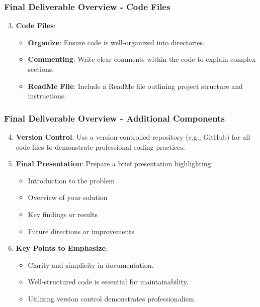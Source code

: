 \documentclass[aspectratio=169]{beamer}
\begin{document}
\begin{frame}[fragile]
    \frametitle{Final Deliverable Overview - Code Files}
    \begin{enumerate}
        \setcounter{enumi}{2}
        \item \textbf{Code Files}:
        \begin{itemize}
            \item \textbf{Organize}: Ensure code is well-organized into directories.
            \item \textbf{Commenting}: Write clear comments within the code to explain complex sections.
            \item \textbf{ReadMe File}: Include a ReadMe file outlining project structure and instructions.
        \end{itemize}
    \end{enumerate}
\end{frame}

\begin{frame}[fragile]
    \frametitle{Final Deliverable Overview - Additional Components}
    \begin{enumerate}
        \setcounter{enumi}{3}
        \item \textbf{Version Control}: Use a version-controlled repository (e.g., GitHub) for all code files to demonstrate professional coding practices.
        
        \item \textbf{Final Presentation}: Prepare a brief presentation highlighting:
        \begin{itemize}
            \item Introduction to the problem
            \item Overview of your solution
            \item Key findings or results
            \item Future directions or improvements
        \end{itemize}
        
        \item \textbf{Key Points to Emphasize}:
        \begin{itemize}
            \item Clarity and simplicity in documentation.
            \item Well-structured code is essential for maintainability.
            \item Utilizing version control demonstrates professionalism.
        \end{itemize}
    \end{enumerate}
\end{frame}
\end{document}
